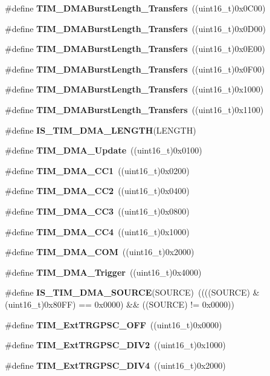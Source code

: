 \begin{DoxyCompactItemize}
\item 
\#define \textbf{ T\+I\+M\+\_\+\+D\+M\+A\+Burst\+Length\+\_\+Transfers}~((uint16\+\_\+t)0x0\+C00)
\item 
\#define \textbf{ T\+I\+M\+\_\+\+D\+M\+A\+Burst\+Length\+\_\+Transfers}~((uint16\+\_\+t)0x0\+D00)
\item 
\#define \textbf{ T\+I\+M\+\_\+\+D\+M\+A\+Burst\+Length\+\_\+Transfers}~((uint16\+\_\+t)0x0\+E00)
\item 
\#define \textbf{ T\+I\+M\+\_\+\+D\+M\+A\+Burst\+Length\+\_\+Transfers}~((uint16\+\_\+t)0x0\+F00)
\item 
\#define \textbf{ T\+I\+M\+\_\+\+D\+M\+A\+Burst\+Length\+\_\+Transfers}~((uint16\+\_\+t)0x1000)
\item 
\#define \textbf{ T\+I\+M\+\_\+\+D\+M\+A\+Burst\+Length\+\_\+Transfers}~((uint16\+\_\+t)0x1100)
\item 
\#define \textbf{ I\+S\+\_\+\+T\+I\+M\+\_\+\+D\+M\+A\+\_\+\+L\+E\+N\+G\+TH}(L\+E\+N\+G\+TH)
\item 
\#define \textbf{ T\+I\+M\+\_\+\+D\+M\+A\+\_\+\+Update}~((uint16\+\_\+t)0x0100)
\item 
\#define \textbf{ T\+I\+M\+\_\+\+D\+M\+A\+\_\+\+C\+C1}~((uint16\+\_\+t)0x0200)
\item 
\#define \textbf{ T\+I\+M\+\_\+\+D\+M\+A\+\_\+\+C\+C2}~((uint16\+\_\+t)0x0400)
\item 
\#define \textbf{ T\+I\+M\+\_\+\+D\+M\+A\+\_\+\+C\+C3}~((uint16\+\_\+t)0x0800)
\item 
\#define \textbf{ T\+I\+M\+\_\+\+D\+M\+A\+\_\+\+C\+C4}~((uint16\+\_\+t)0x1000)
\item 
\#define \textbf{ T\+I\+M\+\_\+\+D\+M\+A\+\_\+\+C\+OM}~((uint16\+\_\+t)0x2000)
\item 
\#define \textbf{ T\+I\+M\+\_\+\+D\+M\+A\+\_\+\+Trigger}~((uint16\+\_\+t)0x4000)
\item 
\#define \textbf{ I\+S\+\_\+\+T\+I\+M\+\_\+\+D\+M\+A\+\_\+\+S\+O\+U\+R\+CE}(S\+O\+U\+R\+CE)~((((S\+O\+U\+R\+CE) \& (uint16\+\_\+t)0x80\+F\+F) == 0x0000) \&\& ((\+S\+O\+U\+R\+C\+E) != 0x0000))
\item 
\#define \textbf{ T\+I\+M\+\_\+\+Ext\+T\+R\+G\+P\+S\+C\+\_\+\+O\+FF}~((uint16\+\_\+t)0x0000)
\item 
\#define \textbf{ T\+I\+M\+\_\+\+Ext\+T\+R\+G\+P\+S\+C\+\_\+\+D\+I\+V2}~((uint16\+\_\+t)0x1000)
\item 
\#define \textbf{ T\+I\+M\+\_\+\+Ext\+T\+R\+G\+P\+S\+C\+\_\+\+D\+I\+V4}~((uint16\+\_\+t)0x2000)
\item 

\end{DoxyCompactItemize}
